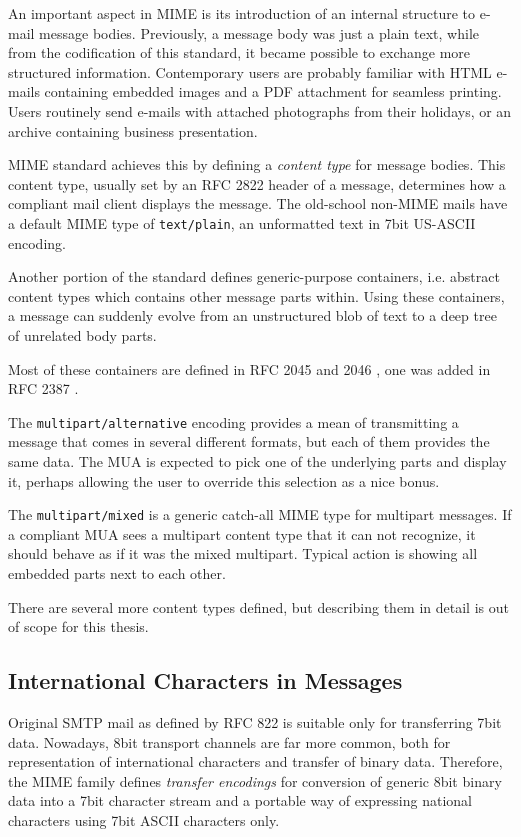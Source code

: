\documentclass[12pt,notitlepage]{report}
\begin{document}
An important aspect in MIME is its introduction of an internal structure to
e-mail message bodies.  Previously, a message body was just a plain text, while
from the codification of this standard, it became possible to exchange more
structured information.  Contemporary users are probably familiar with HTML
e-mails containing embedded images and a PDF attachment for seamless printing.
Users routinely send e-mails with attached photographs from their holidays, or an
archive containing business presentation.

MIME standard achieves this by defining a {\em content type} for message
bodies.  This content type, usually set by an RFC 2822 header of a
message, determines how a compliant mail client displays the message.  The
old-school non-MIME mails have a default MIME type of {\tt text/plain}, an
unformatted text in 7bit US-ASCII encoding.

Another portion of the standard defines generic-purpose containers, i.e.
abstract content types which contains other message parts within.  Using
these containers, a message can suddenly evolve from an unstructured blob of
text to a deep tree of unrelated body parts.

Most of these containers are defined in RFC 2045 \cite{rfc-2045} and 2046
\cite{rfc-2046}, one was added in RFC 2387 \cite{rfc-multipart-related}.

The {\tt multipart/alternative} encoding provides a mean of transmitting a
message that comes in several different formats, but each of them provides the same data.  The
MUA is expected to pick one of the underlying parts and display it, perhaps
allowing the user to override this selection as a nice bonus.

The {\tt multipart/mixed} is a generic catch-all MIME type for multipart
messages.  If a compliant MUA sees a multipart content type that it can not
recognize, it should behave as if it was the mixed multipart.  Typical action is
showing all embedded parts next to each other.

There are several more content types defined, but describing them in detail is
out of scope for this thesis.

\subsection{International Characters in Messages}

Original SMTP mail as defined by RFC 822 is suitable only for transferring
7bit data.  Nowadays, 8bit transport channels are far more common, both for representation of
international characters and transfer of binary data.  Therefore, the MIME
family defines {\em transfer encodings} for conversion of generic 8bit binary
data into a 7bit character stream and a portable way of expressing national
characters using 7bit ASCII characters only.
\end{document}
